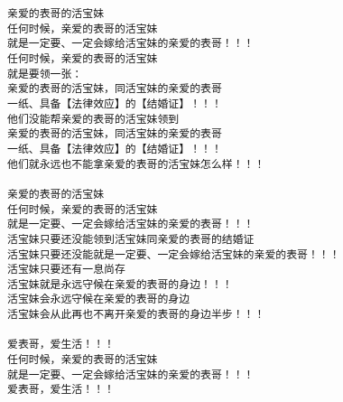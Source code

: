 \documentclass[9pt, b5paper]{article}
\begin{document}
\begin{verbatim}
亲爱的表哥的活宝妹
任何时候，亲爱的表哥的活宝妹
就是一定要、一定会嫁给活宝妹的亲爱的表哥！！！
任何时候，亲爱的表哥的活宝妹
就是要领一张：
亲爱的表哥的活宝妹，同活宝妹的亲爱的表哥
一纸、具备【法律效应】的【结婚证】！！！
他们没能帮亲爱的表哥的活宝妹领到
亲爱的表哥的活宝妹，同活宝妹的亲爱的表哥
一纸、具备【法律效应】的【结婚证】！！！
他们就永远也不能拿亲爱的表哥的活宝妹怎么样！！！

亲爱的表哥的活宝妹
任何时候，亲爱的表哥的活宝妹
就是一定要、一定会嫁给活宝妹的亲爱的表哥！！！
活宝妹只要还没能领到活宝妹同亲爱的表哥的结婚证
活宝妹只要还没能就是一定要、一定会嫁给活宝妹的亲爱的表哥！！！
活宝妹只要还有一息尚存
活宝妹就是永远守候在亲爱的表哥的身边！！！
活宝妹会永远守候在亲爱的表哥的身边
活宝妹会从此再也不离开亲爱的表哥的身边半步！！！

爱表哥，爱生活！！！
任何时候，亲爱的表哥的活宝妹
就是一定要、一定会嫁给活宝妹的亲爱的表哥！！！
爱表哥，爱生活！！！
\end{verbatim}
\end{document}

